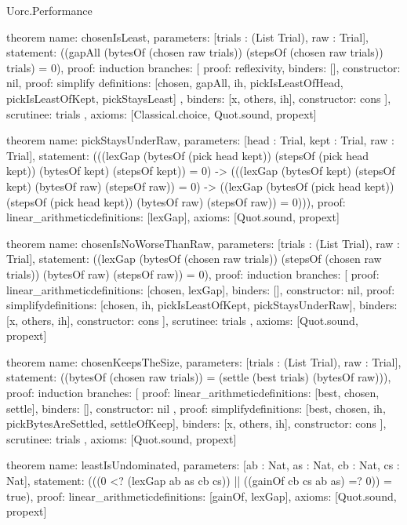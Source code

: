 \begin{lexlean}{Uorc.Performance}
\begin{semanticmodule}
theorem{
  name: chosenIsLeast,
  parameters: [trials : (List Trial), raw : Trial],
  statement: ((gapAll (bytesOf (chosen raw trials)) (stepsOf (chosen raw trials)) trials) = 0),
  proof: induction{
    branches: [
      {proof: reflexivity{}, binders: [], constructor: nil},
      {
        proof: simplify{
          definitions: [chosen, gapAll, ih, pickIsLeastOfHead, pickIsLeastOfKept, pickStaysLeast]
        },
        binders: [x, others, ih],
        constructor: cons
      }
    ],
    scrutinee: trials
  },
  axioms: [Classical.choice, Quot.sound, propext]
}

theorem{
  name: pickStaysUnderRaw,
  parameters: [head : Trial, kept : Trial, raw : Trial],
  statement: (((lexGap (bytesOf (pick head kept)) (stepsOf (pick head kept)) (bytesOf kept) (stepsOf kept)) = 0) -> (((lexGap (bytesOf kept) (stepsOf kept) (bytesOf raw) (stepsOf raw)) = 0) -> ((lexGap (bytesOf (pick head kept)) (stepsOf (pick head kept)) (bytesOf raw) (stepsOf raw)) = 0))),
  proof: linear_arithmetic{definitions: [lexGap]},
  axioms: [Quot.sound, propext]
}

theorem{
  name: chosenIsNoWorseThanRaw,
  parameters: [trials : (List Trial), raw : Trial],
  statement: ((lexGap (bytesOf (chosen raw trials)) (stepsOf (chosen raw trials)) (bytesOf raw) (stepsOf raw)) = 0),
  proof: induction{
    branches: [
      {proof: linear_arithmetic{definitions: [chosen, lexGap]}, binders: [], constructor: nil},
      {
        proof: simplify{definitions: [chosen, ih, pickIsLeastOfKept, pickStaysUnderRaw]},
        binders: [x, others, ih],
        constructor: cons
      }
    ],
    scrutinee: trials
  },
  axioms: [Quot.sound, propext]
}

theorem{
  name: chosenKeepsTheSize,
  parameters: [trials : (List Trial), raw : Trial],
  statement: ((bytesOf (chosen raw trials)) = (settle (best trials) (bytesOf raw))),
  proof: induction{
    branches: [
      {
        proof: linear_arithmetic{definitions: [best, chosen, settle]},
        binders: [],
        constructor: nil
      },
      {
        proof: simplify{definitions: [best, chosen, ih, pickBytesAreSettled, settleOfKeep]},
        binders: [x, others, ih],
        constructor: cons
      }
    ],
    scrutinee: trials
  },
  axioms: [Quot.sound, propext]
}

theorem{
  name: leastIsUndominated,
  parameters: [ab : Nat, as : Nat, cb : Nat, cs : Nat],
  statement: (((0 <? (lexGap ab as cb cs)) || ((gainOf cb cs ab as) =? 0)) = true),
  proof: linear_arithmetic{definitions: [gainOf, lexGap]},
  axioms: [Quot.sound, propext]
}


\end{semanticmodule}
\end{lexlean}
